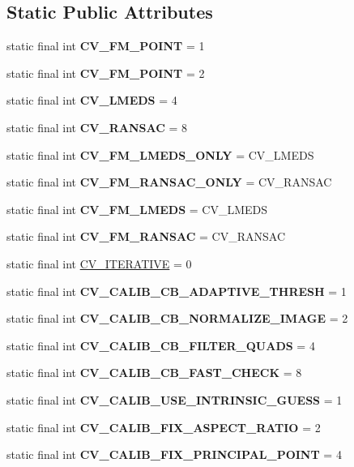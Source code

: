 \subsection*{Static Public Attributes}
\begin{DoxyCompactItemize}
\item 
static final int {\bfseries C\+V\+\_\+\+F\+M\+\_\+P\+O\+I\+NT} = 1
\item 
static final int {\bfseries C\+V\+\_\+\+F\+M\+\_\+P\+O\+I\+NT} = 2
\item 
static final int {\bfseries C\+V\+\_\+\+L\+M\+E\+DS} = 4
\item 
static final int {\bfseries C\+V\+\_\+\+R\+A\+N\+S\+AC} = 8
\item 
static final int {\bfseries C\+V\+\_\+\+F\+M\+\_\+\+L\+M\+E\+D\+S\+\_\+\+O\+N\+LY} = C\+V\+\_\+\+L\+M\+E\+DS
\item 
static final int {\bfseries C\+V\+\_\+\+F\+M\+\_\+\+R\+A\+N\+S\+A\+C\+\_\+\+O\+N\+LY} = C\+V\+\_\+\+R\+A\+N\+S\+AC
\item 
static final int {\bfseries C\+V\+\_\+\+F\+M\+\_\+\+L\+M\+E\+DS} = C\+V\+\_\+\+L\+M\+E\+DS
\item 
static final int {\bfseries C\+V\+\_\+\+F\+M\+\_\+\+R\+A\+N\+S\+AC} = C\+V\+\_\+\+R\+A\+N\+S\+AC
\item 
static final int \hyperlink{group__calib3d__c_ga7bd331d354ffd666d56f3fdfc5937e91}{C\+V\+\_\+\+I\+T\+E\+R\+A\+T\+I\+VE} = 0
\item 
static final int {\bfseries C\+V\+\_\+\+C\+A\+L\+I\+B\+\_\+\+C\+B\+\_\+\+A\+D\+A\+P\+T\+I\+V\+E\+\_\+\+T\+H\+R\+E\+SH} = 1
\item 
static final int {\bfseries C\+V\+\_\+\+C\+A\+L\+I\+B\+\_\+\+C\+B\+\_\+\+N\+O\+R\+M\+A\+L\+I\+Z\+E\+\_\+\+I\+M\+A\+GE} = 2
\item 
static final int {\bfseries C\+V\+\_\+\+C\+A\+L\+I\+B\+\_\+\+C\+B\+\_\+\+F\+I\+L\+T\+E\+R\+\_\+\+Q\+U\+A\+DS} = 4
\item 
static final int {\bfseries C\+V\+\_\+\+C\+A\+L\+I\+B\+\_\+\+C\+B\+\_\+\+F\+A\+S\+T\+\_\+\+C\+H\+E\+CK} = 8
\item 
static final int {\bfseries C\+V\+\_\+\+C\+A\+L\+I\+B\+\_\+\+U\+S\+E\+\_\+\+I\+N\+T\+R\+I\+N\+S\+I\+C\+\_\+\+G\+U\+E\+SS} = 1
\item 
static final int {\bfseries C\+V\+\_\+\+C\+A\+L\+I\+B\+\_\+\+F\+I\+X\+\_\+\+A\+S\+P\+E\+C\+T\+\_\+\+R\+A\+T\+IO} = 2
\item 
static final int {\bfseries C\+V\+\_\+\+C\+A\+L\+I\+B\+\_\+\+F\+I\+X\+\_\+\+P\+R\+I\+N\+C\+I\+P\+A\+L\+\_\+\+P\+O\+I\+NT} = 4

\end{DoxyCompactItemize}
